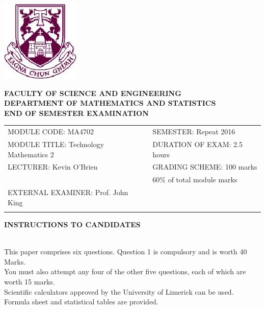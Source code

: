 \documentclass[a4paper,12pt]{article}
\begin{document}
 	
 	\begin{center}
 		\includegraphics[scale=0.60]{shieldtransparent2}
 	\end{center}
 	
 	\begin{center}
 \vspace{1cm}
 \large \bf {FACULTY OF SCIENCE AND ENGINEERING} \\[0.5cm]
 \normalsize DEPARTMENT OF MATHEMATICS AND STATISTICS \\[1.25cm]
 \large \bf {END OF SEMESTER EXAMINATION} \\[1.5cm]
 	\end{center}
 	
 	\begin{tabular}{ll}
 		MODULE CODE: MA4702 & SEMESTER: Repeat 2016\\[1cm]
 		MODULE TITLE: Technology Mathematics 2 & DURATION OF EXAM: 2.5 hours \\[1cm]
 		LECTURER: Kevin O'Brien & GRADING SCHEME: 100 marks\\
 		& \phantom{GRADING SCHEME:} \footnotesize {60\% of total module marks}   \\[0.8cm]
 		EXTERNAL EXAMINER: Prof. John King & \\[1cm]
 		\\[1cm]
 	\end{tabular}
 	\begin{center}
 		{\bf INSTRUCTIONS TO CANDIDATES}
 	\end{center}
 	
 	{\noindent \\ This paper comprises six questions. Question 1 is compulsory and is worth 40 Marks.\\  You must also attempt any four of the other five questions, each of which are worth 15 marks.
 		\\ Scientific calculators approved by the University of Limerick can be used. 
 		\\ Formula sheet and statistical tables are provided.
 	}
 	\normalsize
 	\newpage
 	\large
\end{document}
